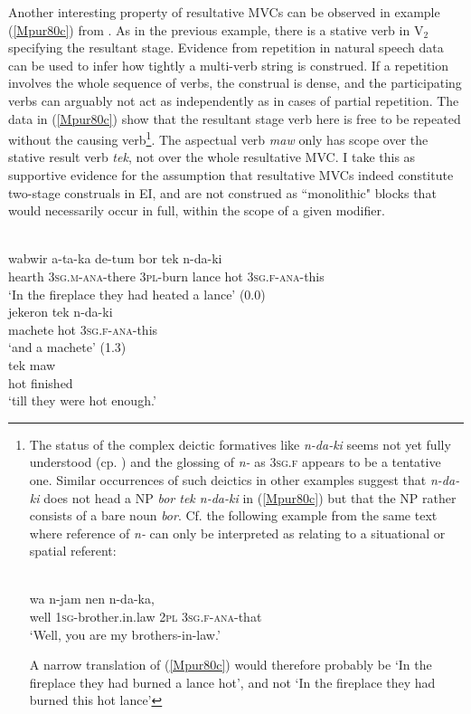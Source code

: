 Another interesting property of resultative MVCs can be observed in example (\ref{Mpur80c}) from . As in the previous example, there is a stative verb in V$_2$ specifying the resultant stage. Evidence from repetition in natural speech data can be used to infer how tightly a multi-verb string is construed. If a repetition involves the whole sequence of verbs, the construal is dense, and the participating verbs can arguably not act as independently as in cases of partial repetition. The  data in (\ref{Mpur80c}) show that the resultant stage verb here is free to be repeated without the causing verb\footnote{The status of the complex deictic formatives like \textit{n-da-ki} seems not yet fully understood (cp. \citealt[64ff.]{ode2002sketch}) and the glossing of \textit{n-} as \textsc{3sg.f} appears to be a tentative one. Similar occurrences of such deictics in other examples suggest that \textit{n-da-ki} does not head a NP \textit{bor tek n-da-ki} in (\ref{Mpur80c}) but that the NP rather consists of a bare noun \textit{bor}. Cf. the following example from the same text where reference of \textit{n-} can only be interpreted as relating to a situational or spatial referent:

\ea \label{Mpur_p105}
\\
\gll wa n-jam nen n-da-ka, \\
well \textsc{1}\textsc{sg}-brother.in.law \textsc{2}\textsc{pl} \textsc{3}\textsc{sg}.\textsc{f}-\textsc{ana}-that \\
\glft `Well, you are my brothers-in-law.'\\ 
\z

A narrow translation of (\ref{Mpur80c}) would therefore probably be `In the fireplace they had burned a lance hot', and not `In the fireplace they had burned this hot lance'}. The aspectual verb \textit{maw} only has scope over the stative result verb \textit{tek}, not over the whole resultative MVC. I take this as supportive evidence for the assumption that resultative MVCs indeed constitute two-stage construals in EI, and are not construed as ``monolithic" blocks that would necessarily occur in full, within the scope of a given modifier.

\ea \label{Mpur80c}
\\
\ea
\gll wabwir a-ta-ka de-tum bor tek n-da-ki \\
hearth \textsc{3}\textsc{sg}.\textsc{m}-\textsc{ana}-there \textsc{3}\textsc{pl}-burn lance hot \textsc{3}\textsc{sg}.\textsc{f}-\textsc{ana}-this \\
\glft `In the fireplace they had heated a lance' (0.0) \\ 
\ex
\gll jekeron tek n-da-ki\\ 
machete hot \textsc{3}\textsc{sg}.\textsc{f}-\textsc{ana}-this \\
\glft `and a machete' (1.3) \\ 
\ex
\gll tek maw \\ 
hot finished \\
\glft `till they were hot enough.'\\ 
\z
\z

